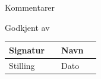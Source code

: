 \documentclass[12pt]{article}
\begin{document}
\begin{reportSection}{Kommentarer}
\vspace*{20mm}



\end{reportSection}
\vspace{1mm}




\begin{reportSection}{Godkjent av}
\vspace{1mm}
\tabulinesep=5pt
\noindent 
{}
\noindent \begin{tabu} to \textwidth {|XU||XU|}
\hline
Signatur  &   & Navn  &   \\ \hline
Stilling   &   & Dato    &        \\ \hline
\end{tabu}

\end{reportSection}
\end{document}
